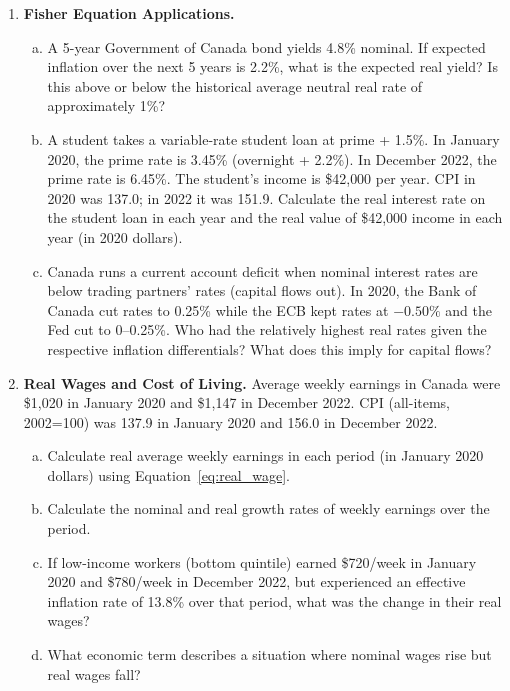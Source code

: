 \begin{enumerate}
\item \textbf{Fisher Equation Applications.}
\begin{enumerate}[(a)]
  \item A 5-year Government of Canada bond yields 4.8\% nominal.
        If expected inflation over the next 5 years is 2.2\%, what
        is the expected real yield? Is this above or below the
        historical average neutral real rate of approximately 1\%?
  \item A student takes a variable-rate student loan at prime + 1.5\%.
        In January 2020, the prime rate is 3.45\% (overnight + 2.2\%).
        In December 2022, the prime rate is 6.45\%. The student's income
        is \$42{,}000 per year. CPI in 2020 was 137.0; in 2022 it was 151.9.
        Calculate the real interest rate on the student loan in each year
        and the real value of \$42{,}000 income in each year (in 2020 dollars).
  \item Canada runs a current account deficit when nominal interest rates
        are below trading partners' rates (capital flows out). In 2020, the
        Bank of Canada cut rates to 0.25\% while the ECB kept rates at
        $-0.50\%$ and the Fed cut to 0--0.25\%. Who had the relatively
        highest real rates given the respective inflation differentials?
        What does this imply for capital flows?
\end{enumerate}

\item \textbf{Real Wages and Cost of Living.}
Average weekly earnings in Canada were \$1{,}020 in January 2020
and \$1{,}147 in December 2022. CPI (all-items, 2002=100) was
137.9 in January 2020 and 156.0 in December 2022.
\begin{enumerate}[(a)]
  \item Calculate real average weekly earnings in each period
        (in January 2020 dollars) using Equation~\ref{eq:real_wage}.
  \item Calculate the nominal and real growth rates of weekly earnings
        over the period.
  \item If low-income workers (bottom quintile) earned \$720/week in
        January 2020 and \$780/week in December 2022, but experienced
        an effective inflation rate of 13.8\% over that period, what
        was the change in their real wages?
  \item What economic term describes a situation where nominal wages
        rise but real wages fall?
\end{enumerate}


\end{enumerate}

